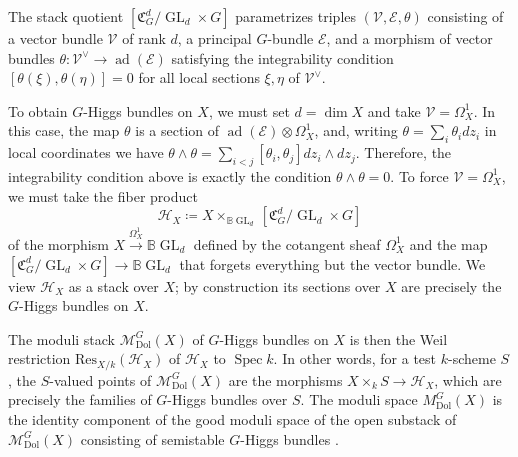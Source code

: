\documentclass[11pt, a4paper]{amsart}
\theoremstyle{definition}
\theoremstyle{myitemstyle}
\newcommand{\Res}{{\mathrm{Res}}}
\newcommand{\mbb}[1]{\mathbb{#1}}
\newcommand{\mc}[1]{{\mathcal{#1}}}
\DeclareMathOperator{\Spec}{Spec}
\DeclareMathOperator{\GL}{GL}
\DeclareMathOperator{\ad}{ad}
\newcommand{\Dol}{{\mathrm{Dol}}}
\begin{document}
The stack quotient $[\mathfrak C_G^d/\GL_d\times G]$ parametrizes triples $(\mc V, \mc E, \theta)$ consisting of a vector bundle $\mc V$ of rank $d$, a principal $G$-bundle $\mc E$, and a morphism of vector bundles $ \theta\colon\mc V^\vee\rightarrow\ad(\mc E)$ satisfying the integrability condition $[\theta(\xi),\theta(\eta)]=0$ for all local sections $\xi,\eta$ of $ \mathcal{V}^{\vee}$.

To obtain $G$-Higgs bundles on $X$, we must set $d=\dim X$ and take $\mc V=\Omega^1_X$. In this case, the map $\theta$ is a section of $\ad(\mathcal{E})\otimes \Omega^1_X$, and, writing $\theta=\sum_i\theta_idz_i$ in local coordinates we have $\theta\wedge\theta=\sum_{i<j}[\theta_i,\theta_j]dz_i\wedge dz_j$. Therefore,  the integrability condition above is exactly the condition $\theta\wedge \theta=0$. To force $\mathcal{V}=\Omega_X^1$, we must take the fiber product
\[
    \mc H_X\coloneqq X\times_{\mbb B\GL_d}[\mathfrak C_G^d/\GL_d\times G]
\]
of the morphism $X\xrightarrow{\Omega^1_X} \mbb B\GL_d$ defined by the cotangent sheaf $\Omega_X^1$ and the map $[\mathfrak C_G^d/\GL_d\times G]\to \mbb B \GL_d$ that forgets everything but the vector bundle. We view $\mc H_X$ as a stack over $X$; by construction its sections over $X$ are precisely the $G$-Higgs bundles on $X$. 

The moduli stack $\mc M^G_\Dol(X)$ of $G$-Higgs bundles on $X$ is then the Weil restriction $\Res_{X/k}(\mc H_X)$ of $\mc H_X$ to $\Spec k$. In other words,  for a test $k$-scheme $S$, the $S$-valued points of $\mc M^G_\Dol(X)$  are  the morphisms $X\times_k S \to \mathcal{H}_X$, which are precisely the families of $G$-Higgs bundles over $S$. 
The moduli space $M_{\Dol}^G(X)$ is the identity component of the good moduli space of the open substack of $\mc M^G_\Dol(X)$ consisting of semistable $G$-Higgs bundles \cite{SimI}.
\end{document}
